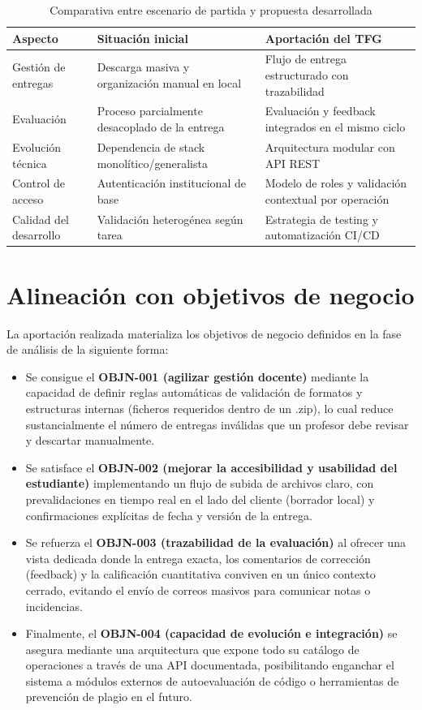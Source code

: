 \begin{table}[!htbp]
\centering
\small
\begin{tabular}{|P{3.0cm}|P{5.3cm}|P{5.3cm}|}
\hline
\textbf{Aspecto} & \textbf{Situaci\'on inicial} & \textbf{Aportaci\'on del TFG} \\
\hline
Gesti\'on de entregas & Descarga masiva y organizaci\'on manual en local & Flujo de entrega estructurado con trazabilidad \\
\hline
Evaluaci\'on & Proceso parcialmente desacoplado de la entrega & Evaluaci\'on y feedback integrados en el mismo ciclo \\
\hline
Evoluci\'on t\'ecnica & Dependencia de stack monol\'itico/generalista & Arquitectura modular con API REST \\
\hline
Control de acceso & Autenticaci\'on institucional de base & Modelo de roles y validaci\'on contextual por operaci\'on \\
\hline
Calidad del desarrollo & Validaci\'on heterog\'enea seg\'un tarea & Estrategia de testing y automatizaci\'on CI/CD \\
\hline
\end{tabular}
\caption{Comparativa entre escenario de partida y propuesta desarrollada}
\label{tab:comparativa-antecedentes}
\end{table}

\FloatBarrier
\section{Alineaci\'on con objetivos de negocio}

La aportaci\'on realizada materializa los objetivos de negocio definidos en la fase de an\'alisis de la siguiente forma:
\begin{itemize}
    \item Se consigue el \textbf{OBJN-001 (agilizar gesti\'on docente)} mediante la capacidad de definir reglas autom\'aticas de validaci\'on de formatos y estructuras internas (ficheros requeridos dentro de un .zip), lo cual reduce sustancialmente el n\'umero de entregas inv\'alidas que un profesor debe revisar y descartar manualmente.
    \item Se satisface el \textbf{OBJN-002 (mejorar la accesibilidad y usabilidad del estudiante)} implementando un flujo de subida de archivos claro, con prevalidaciones en tiempo real en el lado del cliente (borrador local) y confirmaciones expl\'icitas de fecha y versi\'on de la entrega.
    \item Se refuerza el \textbf{OBJN-003 (trazabilidad de la evaluaci\'on)} al ofrecer una vista dedicada donde la entrega exacta, los comentarios de correcci\'on (feedback) y la calificaci\'on cuantitativa conviven en un \'unico contexto cerrado, evitando el env\'io de correos masivos para comunicar notas o incidencias.
    \item Finalmente, el \textbf{OBJN-004 (capacidad de evoluci\'on e integraci\'on)} se asegura mediante una arquitectura que expone todo su cat\'alogo de operaciones a trav\'es de una API documentada, posibilitando enganchar el sistema a m\'odulos externos de autoevaluaci\'on de c\'odigo o herramientas de prevenci\'on de plagio en el futuro.
\end{itemize}

